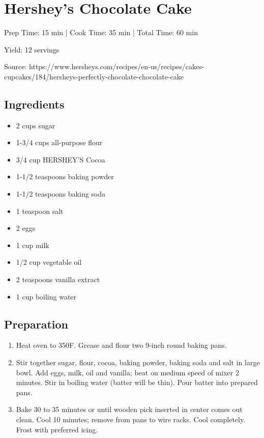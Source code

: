 \section{Hershey's Chocolate Cake}

\begin{center}
Prep Time: 15 min |
Cook Time: 35 min |
Total Time: 60 min

\noindent Yield: 12 servings

\vspace{1em}

Source: https://www.hersheys.com/recipes/en-us/recipes/cakes-cupcakes/184/hersheys-perfectly-chocolate-chocolate-cake
\end{center}

\subsection{Ingredients}
\begin{multicols}{2}
\begin{itemize}
    \item 2 cups sugar
    \item 1-3/4 cups all-purpose flour
    \item 3/4 cup HERSHEY'S Cocoa
    \item 1-1/2 teaspoons baking powder
    \item 1-1/2 teaspoons baking soda
    \item 1 teaspoon salt
    \item 2 eggs
    \item 1 cup milk
    \item 1/2 cup vegetable oil
    \item 2 teaspoons vanilla extract
    \item 1 cup boiling water
\end{itemize}
\end{multicols}

\subsection{Preparation}
\begin{enumerate}
    \item Heat oven to 350F. Grease and flour two 9-inch round baking pans.
    \item Stir together sugar, flour, cocoa, baking powder, baking soda and salt in large bowl. Add eggs, milk, oil and vanilla; beat on medium speed of mixer 2 minutes. Stir in boiling water (batter will be thin). Pour batter into prepared pans.
    \item Bake 30 to 35 minutes or until wooden pick inserted in center comes out clean. Cool 10 minutes; remove from pans to wire racks. Cool completely. Frost with preferred icing.
\end{enumerate}

